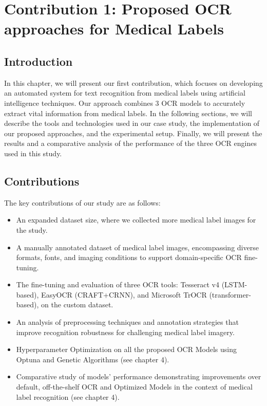\chapter{Contribution 1: Proposed OCR approaches for Medical Labels}
\clearpage
\label{chap:besoins}

\section{Introduction}
In this chapter, we will present our first contribution, which focuses on developing an automated system for text recognition from medical labels using artificial intelligence techniques. Our approach combines 3 OCR models to accurately extract vital information from medical labels. In the following sections, we will describe the tools and technologies used in our case study, the implementation of our proposed approaches, and the experimental setup. Finally, we will present the results and a comparative analysis of the performance of the three OCR engines used in this study.%


\section{Contributions} 
The key contributions of our study are as follows:
\begin{itemize}

\item An expanded dataset size, where we collected more medical label images for the study.

\item A manually annotated dataset of medical label images, encompassing diverse formats, fonts, and imaging conditions to support domain-specific OCR fine-tuning.

\item The fine-tuning and evaluation of three OCR tools: Tesseract v4 (LSTM-based), EasyOCR (CRAFT+CRNN), and Microsoft TrOCR (transformer-based), on the custom dataset.

\item An analysis of preprocessing techniques and annotation strategies that improve recognition robustness for challenging medical label imagery.

\item Hyperparameter Optimization on all the proposed OCR Models using Optuna and Genetic Algorithms (see chapter 4).

\item Comparative study of models' performance demonstrating improvements over default, off-the-shelf OCR and Optimized Models in the context of medical label recognition (see chapter 4).
\end{itemize}%


